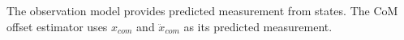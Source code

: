 \documentclass{ws-ijhr}
\begin{document}
The observation model provides predicted measurement from states. The CoM offset estimator uses $x_{com}$ and $\ddot{x}_{com}$ as its predicted measurement. 
\end{document}
